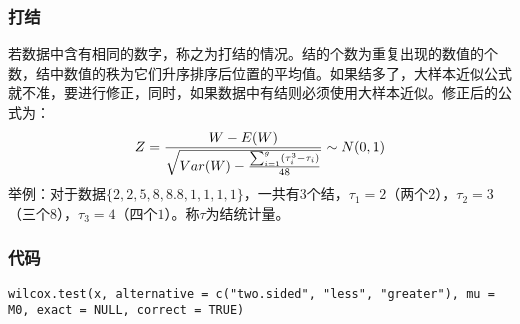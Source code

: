 \subsubsection{打结}
若数据中含有相同的数字，称之为打结的情况。结的个数为重复出现的数值的个数，结中数值的秩为它们升序排序后位置的平均值。如果结多了，大样本近似公式就不准，要进行修正，同时，如果数据中有结则必须使用大样本近似。修正后的公式为：
\begin{equation}
	Z=\frac{W-E(W)}{\sqrt{Var(W)-\frac{\sum_{i=1}^{g}(\tau_i^3-\tau_i)}{48}}}\sim N(0,1)\notag
\end{equation}
\hspace{2em}举例：对于数据$\{2,2,5,8,8.8,1,1,1,1\}$，一共有$3$个结，$\tau_1=2$（两个$2$），$\tau_2=3$（三个$8$），$\tau_3=4$（四个$1$）。称$\tau$为结统计量。
\subsubsection{代码}
\begin{verbatim}
wilcox.test(x, alternative = c("two.sided", "less", "greater"), mu = M0, exact = NULL, correct = TRUE)
\end{verbatim}